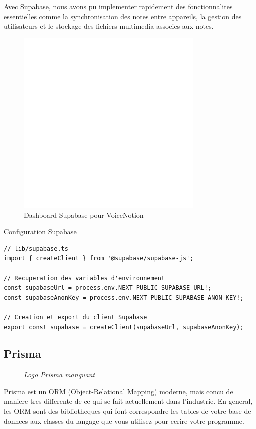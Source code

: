 Avec Supabase, nous avons pu implementer rapidement des fonctionnalites essentielles comme la synchronisation des notes entre appareils, la gestion des utilisateurs et le stockage des fichiers multimedia associes aux notes.

\begin{figure}[H]
\centering
\includegraphics[width=0.8\textwidth]{assets/docs/supabase_dashboard.png}
\caption{Dashboard Supabase pour VoiceNotion}
\label{fig:supabase-dashboard}
\end{figure}

\begin{codebox}{Configuration Supabase}
\begin{lstlisting}
// lib/supabase.ts
import { createClient } from '@supabase/supabase-js';

// Recuperation des variables d'environnement
const supabaseUrl = process.env.NEXT_PUBLIC_SUPABASE_URL!;
const supabaseAnonKey = process.env.NEXT_PUBLIC_SUPABASE_ANON_KEY!;

// Creation et export du client Supabase
export const supabase = createClient(supabaseUrl, supabaseAnonKey);
\end{lstlisting}
\end{codebox}

\subsection{Prisma}
\begin{figure}
    \centering
    \textit{Logo Prisma manquant}
\end{figure}
Prisma est un ORM (Object-Relational Mapping) moderne, mais concu de maniere tres differente de ce qui se fait actuellement dans l'industrie. En general, les ORM sont des bibliotheques qui font correspondre les tables de votre base de donnees aux classes du langage que vous utilisez pour ecrire votre programme.

